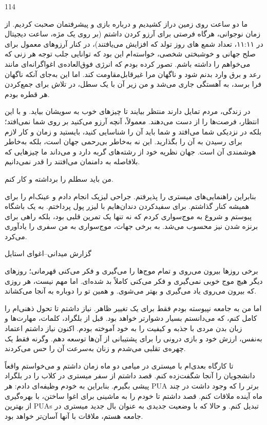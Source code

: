 114

ما دو ساعت روی زمین دراز کشیدیم و درباره بازی و پیشرفتمان صحبت کردیم. از زمان نوجوانی، هرگاه فرصتی برای آرزو کردن داشتم (بر روی یک مژه، ساعت دیجیتال در ۱۱:۱۱، تعداد شمع های روز تولد که افزایش می‌یافتند)، در کنار آرزوهای معمول برای صلح جهانی و خوشبختی شخصی، خواسته‌ام این بود که توانایی جلب توجه هر زنی که می‌خواهم را داشته باشم. تصور کرده بودم که انرژی فوق‌العاده‌ی اغواگرانه‌ای مانند رعد و برق وارد بدنم شود و ناگهان مرا غیرقابل‌مقاومت کند. اما این به‌جای آنکه ناگهان فرا برسد، به آهستگی جاری می‌شد و من زیر آن با یک سطل، در تلاش برای جمع‌کردن هر قطره بودم.

در زندگی، مردم تمایل دارند منتظر بیایند تا چیزهای خوب به سویشان بیاید. و با این انتظار، فرصت‌ها را از دست می‌دهند. معمولاً، آنچه آرزو می‌کنید بر روی شما نمی‌افتد؛ بلکه در نزدیکی شما می‌افتد و شما باید آن را شناسایی کنید، بایستید و زمان و کار لازم برای رسیدن به آن را بگذارید. این نه به‌خاطر بی‌رحمی جهان است، بلکه به‌خاطر هوشمندی آن است. جهان نظریه خود از رشته‌های گربه دارد و می‌داند ما چیزهایی که بلافاصله به دامنمان می‌افتند را قدر نمی‌دانیم.

من باید سطلم را برداشته و کار کنم.

بنابراین راهنمایی‌های میستری را پذیرفتم. جراحی لیزیک انجام دادم و عینک‌ام را برای همیشه کنار گذاشتم. برای سفیدکردن دندان‌هایم با لیزر پول پرداختم. به یک باشگاه پیوستم و شروع به موج‌سواری کردم که نه تنها یک تمرین قلبی بود، بلکه راهی برای برنزه شدن نیز محسوب می‌شد. به برخی جهات، موج‌سواری به من سفری را یادآوری می‌کرد.

گزارش میدانی–اغوای استایل

برخی روزها بیرون می‌روی و تمام موج‌ها را می‌گیری و فکر می‌کنی قهرمانی؛ روزهای دیگر هیچ موج خوبی نمی‌گیری و فکر می‌کنی کاملاً بد شده‌ای. اما مهم نیست، هر روزی که بیرون می‌روی یاد می‌گیری و بهتر می‌شوی. و همین تو را دوباره به آنجا می‌کشاند.

اما من به جامعه نپیوسته بودم فقط برای یک تغییر ظاهر. نیاز داشتم تا تحول ذهنی‌ام را کامل کنم، که می‌دانستم بسیار دشوارتر خواهد بود. قبل از بلگراد، کلمات، مهارت‌ها و زبان بدن مردی با جذبه و کیفیت را به خود آموخته بودم. اکنون نیاز داشتم اعتماد به‌نفس، ارزش خود و بازی درونی را برای پشتیبانی از آن‌ها توسعه دهم. وگرنه فقط یک چهره‌ی تقلبی می‌شدم و زنان به‌سرعت آن را حس می‌کردند.

تا کارگاه بعدی‌ام با میستری در میامی دو ماه زمان داشتم و می‌خواستم واقعاً دانشجویان را آنجا شگفت‌زده کنم. قصد داشتم از سفر میستری در کلاب را در بلگراد پیشی بگیرم. بنابراین به خودم وظیفه‌ای دادم: هر PUA برتر را که وجود داشت در چند ماه آینده ملاقات کنم. قصد داشتم تا خودم را به ماشینی برای اغوا ساختن، با بهره‌گیری از بهترین PUAs تبدیل کنم. و حالا که با وضعیت جدیدی به عنوان بال جدید میستری در جامعه هستم، ملاقات با آنها آسان‌تر خواهد بود.

